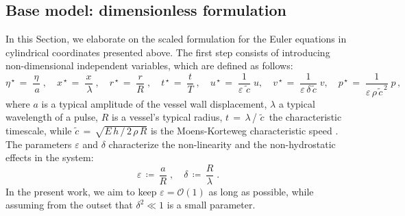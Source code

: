 \documentclass[alpha-refs, 12pt]{wiley-article}
\renewcommand{\O}{\mathcal{O}}
\newcommand{\eps}{\varepsilon}
\begin{document}
\subsection{Base model: dimensionless formulation}

In this Section, we elaborate on the scaled formulation for the Euler equations in cylindrical coordinates presented above. The first step consists of introducing non-dimensional independent variables, which are defined as follows:
\begin{equation*}
  \eta^{\,\star}\,=\;\frac{\eta}{\,a}\;,\quad x^{\,\star}\,=\;\frac{x}{\,\lambda}\;,\quad r^{\,\star}\,=\;\frac{r}{R}\;,\quad t^{\,\star}\,=\;\frac{t}{T}\;,\quad u^{\,\star}\,=\;\frac{1}{\eps\, \tilde{\,c}}\;u, \quad v^{\,\star}\,=\;\frac{1}{\eps\,\delta\,\tilde{c}}\;v, \quad p^{\,\star}\,=\;\frac{1}{\eps\,\rho\, \tilde{c}^{\,2}}\;p\,,
\end{equation*}
where $a$ is a typical amplitude of the vessel wall displacement, $\lambda$ a typical wavelength of a pulse, $R$ is a vessel's typical radius, $ t\,=\,\lambda$\,/\,\,$\tilde{c}\,$ the characteristic timescale, while $\tilde{c}\,=\,\sqrt{E\,h\,/\,2\, \rho\,R}$ is the Moens-Korteweg characteristic speed \citep{Fung1997a}. The parameters $\eps$ and $\delta$ characterize the non-linearity and the non-hydrostatic effects in the system:
\begin{equation*}
  \eps\,\coloneqq\, \frac{a}{R}\;, \quad \delta\,\coloneqq\,\frac{R}{\lambda}\;.
\end{equation*}
In the present work, we aim to keep $\eps = \O(1)$ as long as possible, while assuming from the outset that $\delta^2 \ll 1$ is a small parameter.
\end{document}
